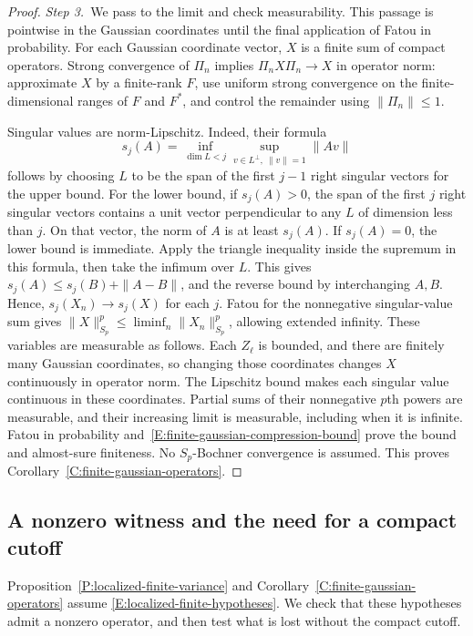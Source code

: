 \begin{proof}
  \medskip
  \noindent\textit{Step 3.~}We pass to the limit and check measurability.
  This passage is pointwise in the Gaussian coordinates until the final
  application of Fatou in probability.
  For each Gaussian coordinate vector, $X$ is a finite sum of compact operators.
  Strong convergence of $\Pi_n$ implies $\Pi_nX\Pi_n \to X$ in operator norm:
  approximate $X$ by a finite-rank $F$, use uniform strong convergence on the
  finite-dimensional ranges of $F$ and $F^*$, and control the remainder using
  $\|\Pi_n\| \le 1$.

  Singular values are norm-Lipschitz. Indeed, their formula
  \[
    s_j(A)=\inf_{\dim L<j}
    \sup_{v\in L^\perp,\ \|v\|=1}\|Av\|
  \]
  follows by choosing $L$ to be the span of the first $j-1$ right singular
  vectors for the upper bound. For the lower bound, if $s_j(A) > 0$, the span
  of the first $j$ right singular vectors contains a unit vector perpendicular
  to any $L$ of dimension less than $j$. On that vector, the norm of $A$ is at
  least $s_j(A)$. If $s_j(A) = 0$, the lower bound is immediate.
  Apply the triangle inequality inside the supremum in this formula, then
  take the infimum over $L$. This gives $s_j(A) \le s_j(B)+\|A-B\|$,
  and the reverse bound by interchanging $A,B$. Hence, $s_j(X_n) \to s_j(X)$ for
  each $j$. Fatou for the nonnegative singular-value sum gives $\|X\|_{S_p}^p
  \le \liminf_n\|X_n\|_{S_p}^p$, allowing extended infinity. These variables are
  measurable as follows. Each $Z_\ell$ is bounded, and there are finitely many
  Gaussian coordinates, so changing those coordinates changes $X$ continuously
  in operator norm. The Lipschitz bound makes each singular value continuous
  in these coordinates. Partial sums of their nonnegative $p$th powers are
  measurable, and their increasing limit is measurable, including when it is
  infinite. Fatou in probability
  and~\eqref{E:finite-gaussian-compression-bound} prove the bound and
  almost-sure finiteness.
  No $S_p$-Bochner convergence is
  assumed. This proves
  Corollary~\ref{C:finite-gaussian-operators}.
\end{proof}

\subsection{A nonzero witness and the need for a compact cutoff}

Proposition~\ref{P:localized-finite-variance} and
Corollary~\ref{C:finite-gaussian-operators} assume
\eqref{E:localized-finite-hypotheses}. We check that these hypotheses admit a
nonzero operator, and then test what is lost without the compact cutoff.

